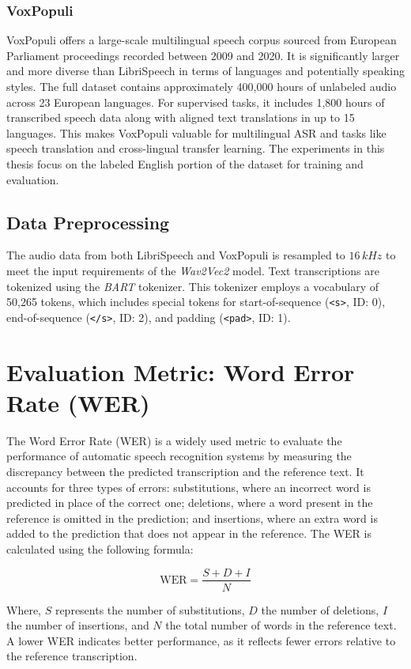 \subsubsection{VoxPopuli}
VoxPopuli \cite{wang2021voxpopulilargescalemultilingualspeech} offers a large-scale multilingual speech corpus sourced from European Parliament proceedings recorded between 2009 and 2020. It is significantly larger and more diverse than LibriSpeech in terms of languages and potentially speaking styles. The full dataset contains approximately 400,000 hours of unlabeled audio across 23 European languages. For supervised tasks, it includes 1,800 hours of transcribed speech data along with aligned text translations in up to 15 languages. This makes VoxPopuli valuable for multilingual ASR and tasks like speech translation and cross-lingual transfer learning. The experiments in this thesis focus on the labeled English portion of the dataset for training and evaluation.

\subsection{Data Preprocessing}

The audio data from both LibriSpeech and VoxPopuli is resampled to $16\,kHz$ to meet the input requirements of the \textit{Wav2Vec2} model. Text transcriptions are tokenized using the \textit{BART} tokenizer. This tokenizer employs a vocabulary of 50,265 tokens, which includes special tokens for start-of-sequence (\texttt{<s>}, ID: 0), end-of-sequence (\texttt{</s>}, ID: 2), and padding (\texttt{<pad>}, ID: 1).

\section{Evaluation Metric: Word Error Rate (WER)}
The Word Error Rate (WER) is a widely used metric to evaluate the performance of automatic speech recognition systems by measuring the discrepancy between the predicted transcription and the reference text. It accounts for three types of errors: substitutions, where an incorrect word is predicted in place of the correct one; deletions, where a word present in the reference is omitted in the prediction; and insertions, where an extra word is added to the prediction that does not appear in the reference. The WER is calculated using the following formula:

\[
\text{WER} = \frac{S + D + I}{N}
\]

Where, \(S\) represents the number of substitutions, \(D\) the number of deletions, \(I\) the number of insertions, and \(N\) the total number of words in the reference text. A lower WER indicates better performance, as it reflects fewer errors relative to the reference transcription.

